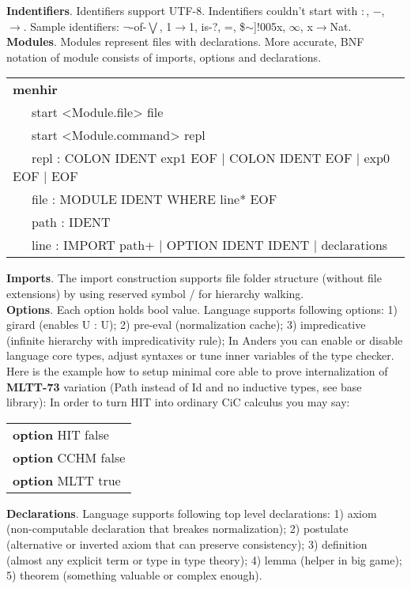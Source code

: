 \documentclass[a4paper,UKenglish,cleveref, autoref, thm-restate]{lipics-v2021}
\begin{document}
\textbf{Indentifiers}. Identifiers support UTF-8. Indentifiers couldn't start with $:$, $-$, $\rightarrow$. Sample identifiers:
$\neg$-of-$\bigvee$, 1$\rightarrow$1, is-?, =, \$$\sim$]!005x, $\infty$, x$\rightarrow$Nat.\\

\textbf{Modules}. Modules represent files with declarations. More accurate, BNF notation of module consists of imports, options and declarations.
\begin{table}[ht]
\begin{tabular}{l}
\textbf{menhir} \\
\ \ \ start <Module.file> file \\
\ \ \ start <Module.command> repl \\
\ \ \ repl : COLON IDENT exp1 EOF | COLON IDENT EOF | exp0 EOF | EOF \\
\ \ \ file : MODULE IDENT WHERE line* EOF \\
\ \ \ path : IDENT \\
\ \ \ line : IMPORT path+ | OPTION IDENT IDENT | declarations \\
\end{tabular}
\end{table}

\textbf{Imports}. The import construction supports file folder structure (without file extensions) by using reserved symbol / for hierarchy walking.\\

\textbf{Options}. Each option holds bool value. Language supports following options: 1) girard (enables U : U); 2) pre-eval (normalization cache);
3) impredicative (infinite hierarchy with impredicativity rule);
In Anders you can enable or disable language core types, adjust syntaxes or tune inner variables of the type checker.
Here is the example how to setup minimal core able to prove internalization of \textbf{MLTT-73} variation (Path instead of Id and no inductive types, see base library):
In order to turn HIT into ordinary CiC calculus you may say:

\begin{table}[ht]
\begin{tabular}{l}
\textbf{option} HIT false \\
\textbf{option} CCHM false \\
\textbf{option} MLTT true \\
\end{tabular}
\end{table}

\textbf{Declarations}. Language supports following top level declarations:
1) axiom (non-computable declaration that breakes normalization);
2) postulate (alternative or inverted axiom that can preserve consistency);
3) definition (almost any explicit term or type in type theory);
4) lemma (helper in big game);
5) theorem (something valuable or complex enough).
\end{document}
